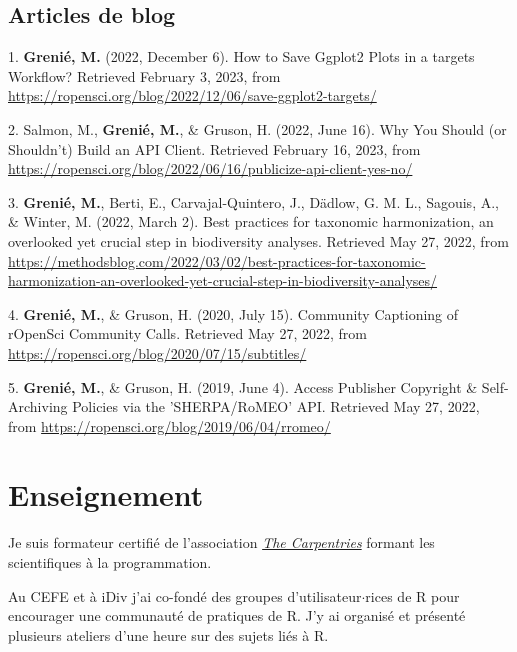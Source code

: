 \documentclass[10pt,a4paper,]{article}
\newlength{\cslhangindent}
\newenvironment{CSLReferences}[2] %
 {\begin{list}{}{%
  \setlength{\itemindent}{0pt}
  \setlength{\leftmargin}{0pt}
  \setlength{\parsep}{0pt}
  \ifodd #1
   \setlength{\leftmargin}{\cslhangindent}
   \setlength{\itemindent}{-1\cslhangindent}
  \fi
  \setlength{\itemsep}{#2\baselineskip}}}
 {\end{list}}
\begin{document}
\subsection{Articles de blog}\label{articles-de-blog}

\label{refs-e8e5b0644796f5cf65fc2be78a8ed8d4}
\begin{CSLReferences}{1}{1}
1. \textbf{Grenié, M.} (2022, December 6). How to Save Ggplot2 Plots in
a targets Workflow? Retrieved February 3, 2023, from
\url{https://ropensci.org/blog/2022/12/06/save-ggplot2-targets/}

2. Salmon, M., \textbf{Grenié, M.}, \& Gruson, H. (2022, June 16). Why
You Should (or Shouldn't) Build an API Client. Retrieved February 16,
2023, from
\url{https://ropensci.org/blog/2022/06/16/publicize-api-client-yes-no/}

3. \textbf{Grenié, M.}, Berti, E., Carvajal-Quintero, J., Dädlow, G. M.
L., Sagouis, A., \& Winter, M. (2022, March 2). Best practices for
taxonomic harmonization, an overlooked yet crucial step in biodiversity
analyses. Retrieved May 27, 2022, from
\url{https://methodsblog.com/2022/03/02/best-practices-for-taxonomic-harmonization-an-overlooked-yet-crucial-step-in-biodiversity-analyses/}

4. \textbf{Grenié, M.}, \& Gruson, H. (2020, July 15). Community
Captioning of rOpenSci Community Calls. Retrieved May 27, 2022, from
\url{https://ropensci.org/blog/2020/07/15/subtitles/}

5. \textbf{Grenié, M.}, \& Gruson, H. (2019, June 4). Access Publisher
Copyright \& Self-Archiving Policies via the 'SHERPA/RoMEO' API.
Retrieved May 27, 2022, from
\url{https://ropensci.org/blog/2019/06/04/rromeo/}

\end{CSLReferences}

\section{Enseignement}\label{enseignement}

Je suis formateur certifié de l'association
\href{https://carpentries.org/}{\emph{The Carpentries}} formant les
scientifiques à la programmation.

Au CEFE et à iDiv j'ai co-fondé des groupes d'utilisateur\(\cdotp\)rices
de R pour encourager une communauté de pratiques de R. \newline J'y ai
organisé et présenté plusieurs ateliers d'une heure sur des sujets liés
à R.
\end{document}
